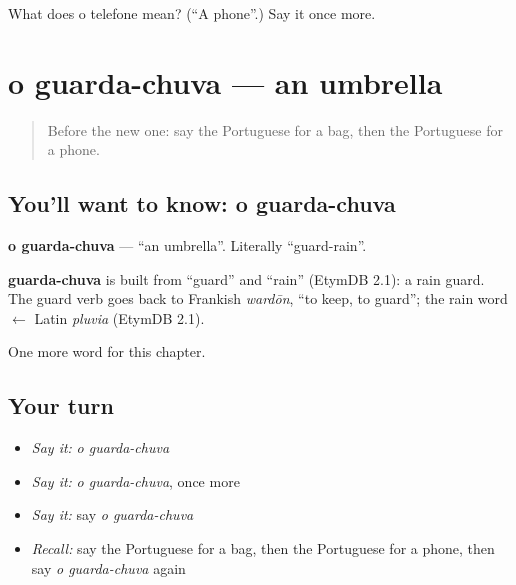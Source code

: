 \begin{tcolorbox}[breakable,colback=teal!4,colframe=teal!35!black,title={Before you move on}]
What does o telefone mean? (\textquotedblleft{}A phone\textquotedblright{}.) Say it once more.
\end{tcolorbox}
\section[o guarda-chuva]{o guarda-chuva — an umbrella}

\label{lesson:PT-C53-guarda-chuva}



\begin{quote}
Before the new one: say the Portuguese for a bag, then the Portuguese for a phone.
\end{quote}

\subsection*{You'll want to know: o guarda-chuva}
\textbf{o guarda-chuva} — \textquotedblleft{}an umbrella\textquotedblright{}. Literally \textquotedblleft{}guard-rain\textquotedblright{}.

\begin{cousinweb}
\textbf{guarda-chuva} is built from \textquotedblleft{}guard\textquotedblright{} and \textquotedblleft{}rain\textquotedblright{} (EtymDB 2.1): a rain guard. The guard verb goes back to Frankish \emph{wardōn}, \textquotedblleft{}to keep, to guard\textquotedblright{}; the rain word $\leftarrow$ Latin \emph{pluvia} (EtymDB 2.1).
\end{cousinweb}

\begin{grammarlens}[title={What you've built}]
One more word for this chapter.
\end{grammarlens}

\subsection*{Your turn}
\begin{itemize}
\raggedright
  \item \emph{Say it:} \emph{o guarda-chuva}
  \item \emph{Say it:} \emph{o guarda-chuva}, once more
  \item \emph{Say it:} say \emph{o guarda-chuva}
  \item \emph{Recall:} say the Portuguese for a bag, then the Portuguese for a phone, then say \emph{o guarda-chuva} again
\end{itemize}

